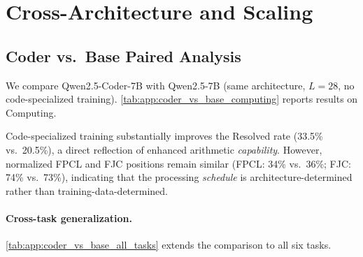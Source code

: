 
\section{Cross-Architecture and Scaling}
\label{app:cross_architecture_and_scaling}

\subsection{Coder vs.\ Base Paired Analysis}
\label{app:subsec:coder_vs_base}

We compare Qwen2.5-Coder-7B with Qwen2.5-7B (same architecture, $L{=}28$, no code-specialized training).
\cref{tab:app:coder_vs_base_computing} reports results on Computing.

\begin{table}[H]
\centering
\caption{Coder vs.\ Base on Computing: outcome distribution and brewing
layer positions for Qwen2.5-Coder-7B and Qwen2.5-7B ($L{=}28$).
Normalized depths in parentheses.}
\label{tab:app:coder_vs_base_computing}
\end{table}

Code-specialized training substantially improves the Resolved rate (33.5\% vs.\ 20.5\%), a direct reflection of enhanced arithmetic \emph{capability}.
However, normalized FPCL and FJC positions remain similar (FPCL: 34\% vs.\ 36\%; FJC: 74\% vs.\ 73\%), indicating that the processing \emph{schedule} is architecture-determined rather than training-data-determined.

\paragraph{Cross-task generalization.}
\cref{tab:app:coder_vs_base_all_tasks} extends the comparison to all six tasks.


